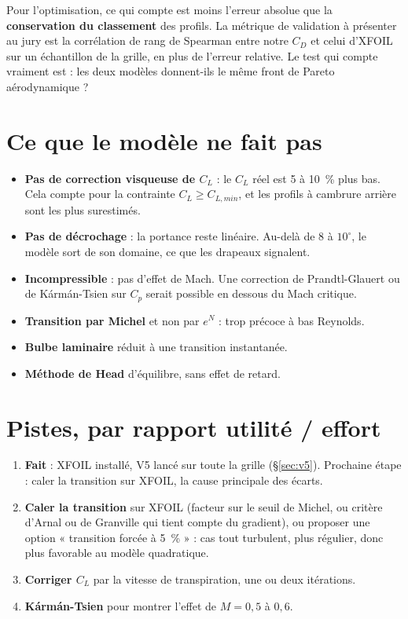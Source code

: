 \begin{resultat}
Pour l'optimisation, ce qui compte est moins l'erreur absolue que la \textbf{conservation du classement} des profils. La métrique de validation à présenter au jury est la corrélation de rang de Spearman entre notre $C_D$ et celui d'XFOIL sur un échantillon de la grille, en plus de l'erreur relative. Le test qui compte vraiment est : les deux modèles donnent-ils le même front de Pareto aérodynamique ?
\end{resultat}

\section{Ce que le modèle ne fait pas}
\begin{itemize}
\item \textbf{Pas de correction visqueuse de $C_L$} : le $C_L$ réel est 5 à 10~\% plus bas. Cela compte pour la contrainte $C_L\ge C_{L,min}$, et les profils à cambrure arrière sont les plus surestimés.
\item \textbf{Pas de décrochage} : la portance reste linéaire. Au-delà de 8 à $10^\circ$, le modèle sort de son domaine, ce que les drapeaux signalent.
\item \textbf{Incompressible} : pas d'effet de Mach. Une correction de Prandtl-Glauert ou de Kármán-Tsien sur $C_p$ serait possible en dessous du Mach critique.
\item \textbf{Transition par Michel} et non par $e^N$ : trop précoce à bas Reynolds.
\item \textbf{Bulbe laminaire} réduit à une transition instantanée.
\item \textbf{Méthode de Head} d'équilibre, sans effet de retard.
\end{itemize}

\section{Pistes, par rapport utilité / effort}
\begin{enumerate}
\item \textbf{Fait} : XFOIL installé, V5 lancé sur toute la grille (§\ref{sec:v5}). Prochaine étape : caler la transition sur XFOIL, la cause principale des écarts.
\item \textbf{Caler la transition} sur XFOIL (facteur sur le seuil de Michel, ou critère d'Arnal ou de Granville qui tient compte du gradient), ou proposer une option « transition forcée à 5~\% » : cas tout turbulent, plus régulier, donc plus favorable au modèle quadratique.
\item \textbf{Corriger $C_L$} par la vitesse de transpiration, une ou deux itérations.
\item \textbf{Kármán-Tsien} pour montrer l'effet de $M=0{,}5$ à $0{,}6$.
\end{enumerate}

